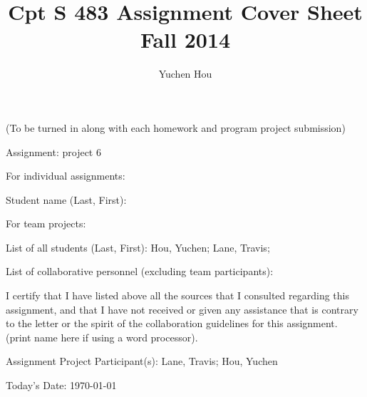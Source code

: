 \documentclass[12pt]{article}
\begin{document}
\title{Cpt S 483 Assignment Cover Sheet \\ Fall 2014}
\author{Yuchen Hou}
\maketitle

(To be turned in along with each homework and program project submission)

Assignment: project 6

For individual assignments:

Student name (Last, First):

For team projects:

List of all students (Last, First): Hou, Yuchen; Lane, Travis;

List of collaborative personnel (excluding team participants):

I certify that I have listed above all the sources that I consulted regarding this assignment, and that I have not received or given any assistance that is contrary to the letter or the spirit of the collaboration guidelines for this assignment. (print name here if using a word processor).

Assignment Project Participant(s): Lane, Travis; Hou, Yuchen

Today's Date: \today
\end{document}
